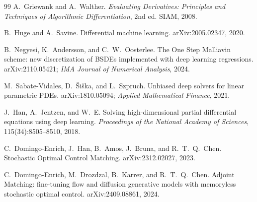 \documentclass[11pt]{article}
\theoremstyle{definition}
\theoremstyle{remark}
\begin{document}
\begin{thebibliography}{99}
A.~Griewank and A.~Walther.
\newblock \emph{Evaluating Derivatives: Principles and Techniques of Algorithmic
Differentiation}, 2nd ed.
\newblock SIAM, 2008.

B.~Huge and A.~Savine.
\newblock Differential machine learning.
\newblock arXiv:2005.02347, 2020.

B.~Negyesi, K.~Andersson, and C.~W.~Oosterlee.
\newblock The One Step Malliavin scheme: new discretization of BSDEs implemented with deep
learning regressions.
\newblock arXiv:2110.05421; \emph{IMA Journal of Numerical Analysis}, 2024.

M.~Sabate-Vidales, D.~\v{S}i\v{s}ka, and L.~Szpruch.
\newblock Unbiased deep solvers for linear parametric PDEs.
\newblock arXiv:1810.05094; \emph{Applied Mathematical Finance}, 2021.

J.~Han, A.~Jentzen, and W.~E.
\newblock Solving high-dimensional partial differential equations using deep learning.
\newblock \emph{Proceedings of the National Academy of Sciences}, 115(34):8505--8510, 2018.

C.~Domingo-Enrich, J.~Han, B.~Amos, J.~Bruna, and R.~T.~Q.~Chen.
\newblock Stochastic Optimal Control Matching.
\newblock arXiv:2312.02027, 2023.

C.~Domingo-Enrich, M.~Drozdzal, B.~Karrer, and R.~T.~Q.~Chen.
\newblock Adjoint Matching: fine-tuning flow and diffusion generative models with
memoryless stochastic optimal control.
\newblock arXiv:2409.08861, 2024.

\end{thebibliography}
\end{document}

